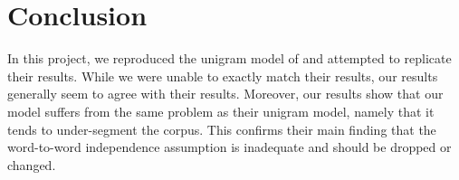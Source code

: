 \section{Conclusion}

In this project, we reproduced the unigram model of \cite{Goldwater200921} and attempted to replicate their results. While we were unable to exactly match their results, our results generally seem to agree with their results. Moreover, our results show that our model suffers from the same problem as their unigram model, namely that it tends to under-segment the corpus. This confirms their main finding that the word-to-word independence assumption is inadequate and should be dropped or changed.
